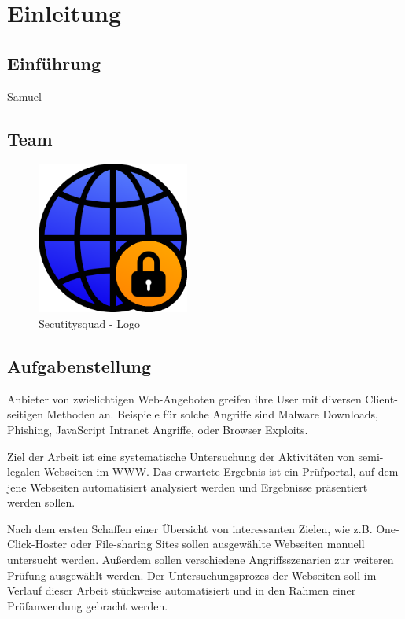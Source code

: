 \chapter{Einleitung}

\section{Einführung}

\todo Samuel

\section{Team}

\begin{figure}[H]
  \centering
  \includegraphics[width=5cm]{images/securitysquad}
  \caption{Secutitysquad - Logo}
  \label{fig:securitysquad-logo}
\end{figure}

\section{Aufgabenstellung}
Anbieter von zwielichtigen Web-Angeboten greifen ihre User mit diversen Client-seitigen Methoden an. Beispiele für solche Angriffe sind Malware Downloads, Phishing, JavaScript Intranet Angriffe, oder Browser Exploits.

Ziel der Arbeit ist eine systematische Untersuchung der Aktivitäten von semi-legalen Webseiten im \ac{WWW}. Das erwartete Ergebnis ist ein Prüfportal, auf dem jene Webseiten automatisiert analysiert werden und Ergebnisse präsentiert werden sollen.

Nach dem ersten Schaffen einer Übersicht von interessanten Zielen, wie z.B. One-Click-Hoster oder File-sharing Sites sollen ausgewählte Webseiten manuell untersucht werden. Außerdem sollen verschiedene Angriffsszenarien zur weiteren Prüfung ausgewählt werden. Der Untersuchungsprozes der Webseiten soll im Verlauf dieser Arbeit stückweise automatisiert und in den Rahmen einer Prüfanwendung gebracht werden.

